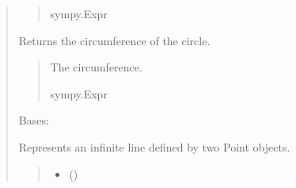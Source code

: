 \documentclass[letterpaper,10pt,english]{sphinxmanual}
\begin{document}
\begin{quote}
\begin{fulllineitems}
\begin{fulllineitems}
\begin{quote}
\begin{description}
\sphinxAtStartPar
sympy.Expr

\end{description}\end{quote}

\end{fulllineitems}


\begin{fulllineitems}
\label{\detokenize{pygeox:pygeox.basic_objects.Circle.perimeter}}
\pysigstartsignatures
\pysigline
{}
\pysigstopsignatures
\sphinxAtStartPar
Returns the circumference of the circle.
\begin{quote}\begin{description}
\sphinxAtStartPar
The circumference.

\sphinxAtStartPar
sympy.Expr

\end{description}\end{quote}

\end{fulllineitems}


\end{fulllineitems}


\begin{fulllineitems}
\label{\detokenize{pygeox:pygeox.basic_objects.Line}}
\pysigstartsignatures
\pysiglinewithargsret
{}
{\sphinxparamcomma {}\sphinxparamcomma {}}
{}
\pysigstopsignatures
\sphinxAtStartPar
Bases: 

\sphinxAtStartPar
Represents an infinite line defined by two Point objects.
\begin{quote}\begin{description}
\begin{itemize}
\item {} 
\sphinxAtStartPar
{} ()


\end{itemize}
\end{description}
\end{quote}
\end{fulllineitems}
\end{quote}
\end{document}
